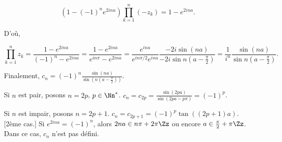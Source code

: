 {{\begin{itemize}
$$(1-(-1)^ne^{2ina})\prod_{k=1}^{n}(-z_k)=1-e^{2ina}.$$

D'où,

$$\prod_{k=1}^{n}z_k=\frac{1-e^{2ina}}{(-1)^n-e^{2ina}}=\frac{1-e^{2ina}}{e^{in\pi}-e^{2ina}}=\frac{e^{ina}}{e^{in\pi/2}e^{ina}}\frac{-2i\sin(na)}{-2i\sin n(a-\frac{\pi}{2})}=\frac{1}{i^n} \frac{\sin(na)}{\sin n(a-\frac{\pi}{2})}.$$

Finalement, $c_n=(-1)^n\frac{\sin(na)}{\sin(n(a-\frac{\pi}{2}))}$.

Si $n$ est pair, posons $n=2p$, $p\in\Nn^*$. $c_n=c_{2p}=\frac{\sin(2pa)}{\sin (2pa-p\pi)}=(-1)^p$.

Si $n$ est impair, posons $n=2p+1$. $c_n=c_{2p+1}=(-1)^p\tan((2p+1)a)$.
[2ème cas.] Si $e^{2ina}=(-1)^n$, alors $2na\in n\pi+2\pi\Zz$ ou encore $a\in\frac{\pi}{2}+\pi\Zz$. Dans ce cas, $c_n$ n'est pas défini.
\end{itemize}
}
}
